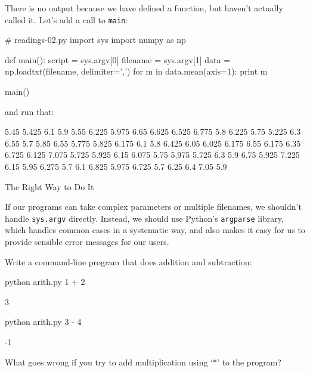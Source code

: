 There is no output because we have defined a function, but haven't
actually called it. Let's add a call to \texttt{main}:

\begin{VerbIn}
# readings-02.py
import sys
import numpy as np

def main():
    script = sys.argv[0]
    filename = sys.argv[1]
    data = np.loadtxt(filename, delimiter=',')
    for m in data.mean(axis=1):
        print m

main()
\end{VerbIn}

and run that:


\begin{VerbOut}
5.45
5.425
6.1
5.9
5.55
6.225
5.975
6.65
6.625
6.525
6.775
5.8
6.225
5.75
5.225
6.3
6.55
5.7
5.85
6.55
5.775
5.825
6.175
6.1
5.8
6.425
6.05
6.025
6.175
6.55
6.175
6.35
6.725
6.125
7.075
5.725
5.925
6.15
6.075
5.75
5.975
5.725
6.3
5.9
6.75
5.925
7.225
6.15
5.95
6.275
5.7
6.1
6.825
5.975
6.725
5.7
6.25
6.4
7.05
5.9
\end{VerbOut}

\begin{swcbox}{The Right Way to Do It}

If our programs can take complex parameters or multiple filenames, we
shouldn't handle \texttt{sys.argv} directly. Instead, we should use
Python's \texttt{argparse} library, which handles common cases in a
systematic way, and also makes it easy for us to provide sensible error
messages for our users.

\end{swcbox}

\begin{challenge}
  Write a command-line program that does addition and subtraction:
\begin{VerbIn}
python arith.py 1 + 2
\end{VerbIn}
\begin{VerbOut}
3
\end{VerbOut}
\begin{VerbIn}
python arith.py 3 - 4
\end{VerbIn}
\begin{VerbOut}
-1
\end{VerbOut}
  What goes wrong if you try to add multiplication using `*' to the
  program?
\end{challenge}

